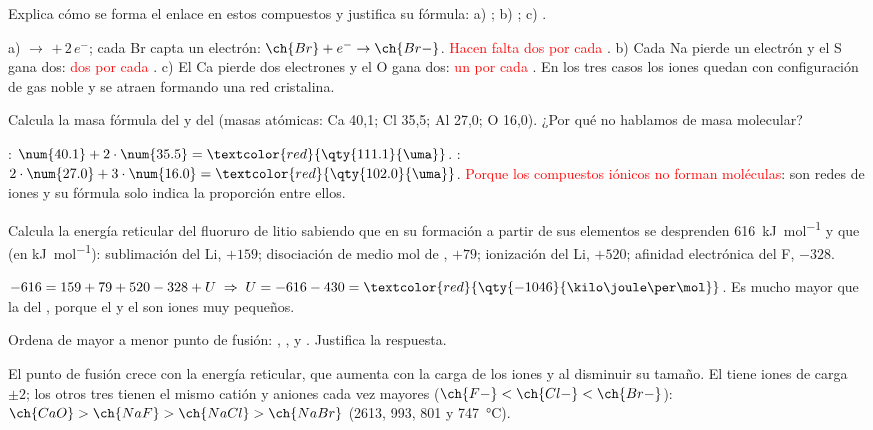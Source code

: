 \begin{exercise}
    Explica cómo se forma el enlace en estos compuestos y justifica su fórmula: a) ; b) ; c) .
    \begin{solu}
        a)  \(\rightarrow\)  \(+\, 2\,e^-\); cada Br capta un electrón: \(\ch{Br} + e^- \rightarrow \ch{Br-}\).
        \textcolor{red}{Hacen falta dos  por cada }. b) Cada Na pierde un electrón y el S gana dos:
        \textcolor{red}{dos  por cada }. c) El Ca pierde dos electrones y el O gana dos:
        \textcolor{red}{un  por cada }. En los tres casos los iones quedan con configuración de gas noble y
        se atraen formando una red cristalina.
    \end{solu}
\end{exercise}

\begin{exercise}
    Calcula la masa fórmula del  y del  (masas atómicas: Ca 40,1; Cl 35,5; Al 27,0; O 16,0). ¿Por qué no
    hablamos de masa molecular?
    \begin{solu}
        : \(\num{40.1} + 2 \cdot \num{35.5} = \textcolor{red}{\qty{111.1}{\uma}}\). :
        \(2 \cdot \num{27.0} + 3 \cdot \num{16.0} = \textcolor{red}{\qty{102.0}{\uma}}\). \textcolor{red}{Porque los compuestos
        iónicos no forman moléculas}: son redes de iones y su fórmula solo indica la proporción entre ellos.
    \end{solu}
\end{exercise}

\begin{exercise}
    Calcula la energía reticular del fluoruro de litio sabiendo que en su formación a partir de sus elementos se desprenden
    \qty{616}{\kilo\joule\per\mol} y que (en \unit{\kilo\joule\per\mol}): sublimación del Li, \(+159\); disociación de medio mol de
    , \(+79\); ionización del Li, \(+520\); afinidad electrónica del F, \(-328\).
    \begin{solu}
        \(-616 = 159 + 79 + 520 - 328 + U \;\Rightarrow\; U = -616 - 430 = \textcolor{red}{\qty{-1046}{\kilo\joule\per\mol}}\).
        Es mucho mayor que la del , porque el  y el  son iones muy pequeños.
    \end{solu}
\end{exercise}

\begin{exercise}
    Ordena de mayor a menor punto de fusión: , ,  y . Justifica la respuesta.
    \begin{solu}
        El punto de fusión crece con la energía reticular, que aumenta con la carga de los iones y al disminuir su tamaño.
        El  tiene iones de carga \(\pm 2\); los otros tres tienen el mismo catión y aniones cada vez mayores
        (\(\ch{F-} < \ch{Cl-} < \ch{Br-}\)): \textcolor{red}{\(\ch{CaO} > \ch{NaF} > \ch{NaCl} > \ch{NaBr}\)} (2613, 993, 801 y
        \qty{747}{\degreeCelsius}).
    \end{solu}
\end{exercise}

